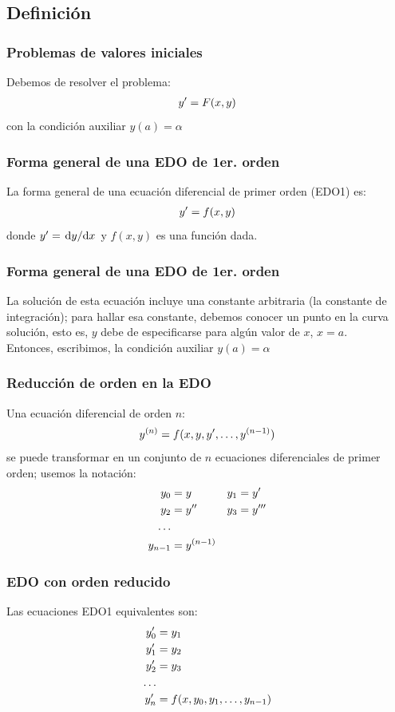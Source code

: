 \documentclass[12pt]{beamer}
\begin{document}
\subsection{Definición}

\begin{frame}
\frametitle{Problemas de valores iniciales}
Debemos de resolver el problema:
\pause
\begin{align*}
{y}^{\prime} = F (x, y)
\end{align*}
con la condición auxiliar $y (a) = \alpha$
\end{frame}
\begin{frame}
\frametitle{Forma general de una EDO de 1er. orden}
La forma general de una ecuación diferencial de primer orden (EDO1) es:
\begin{align*}
{y}^{\prime} = f (x, y)
\end{align*}
donde ${y}^{\prime} = \dv*{y}{x}$ y $f (x, y)$ es una función dada.
\end{frame}
\begin{frame}
\frametitle{Forma general de una EDO de 1er. orden}
La solución de esta ecuación incluye una constante arbitraria (la constante de integración); \pause para hallar esa constante, debemos conocer un punto en la curva solución, esto es, $y$ debe de especificarse para algún valor de $x$, $x = a$. 
\\
\bigskip
\pause
Entonces, escribimos, la condición auxiliar $y (a) = \alpha$
\end{frame}
\begin{frame}
\frametitle{Reducción de orden en la EDO}
Una ecuación diferencial de orden $n$:
\pause
\begin{align*}
y^{(n)} = f (x, y, {y}^{\prime}, \ldots, y^{(n-1)})
\end{align*}
\pause
se puede transformar en un conjunto de $n$ ecuaciones diferenciales de primer orden; usemos la notación:
\pause
\begin{alignat*}{5}
y_{0} & = y & y_{1} & = {y}^{\prime} \\
y_{2} & = {y}^{\prime \prime} & y_{3} & = {y}^{\prime \prime \prime} \\
\ldots & & &  \\ 
y_{n-1} & = y^{(n-1)} & & 
\end{alignat*}
\end{frame}
\begin{frame}
\frametitle{EDO con orden reducido}
Las ecuaciones EDO1 equivalentes son:
\pause
\begin{eqnarray*}
\begin{aligned}
{y}^{\prime}_{0} &= y_{1} \\
{y}^{\prime}_{1} &= y_{2} \\
{y}^{\prime}_{2} &= y_{3} \\
\ldots \\
{y}^{\prime}_{n} &= f (x, y_{0}, y_{1}, \ldots, y_{n - 1})
\end{aligned}
\end{eqnarray*}
\end{frame}
\end{document}
